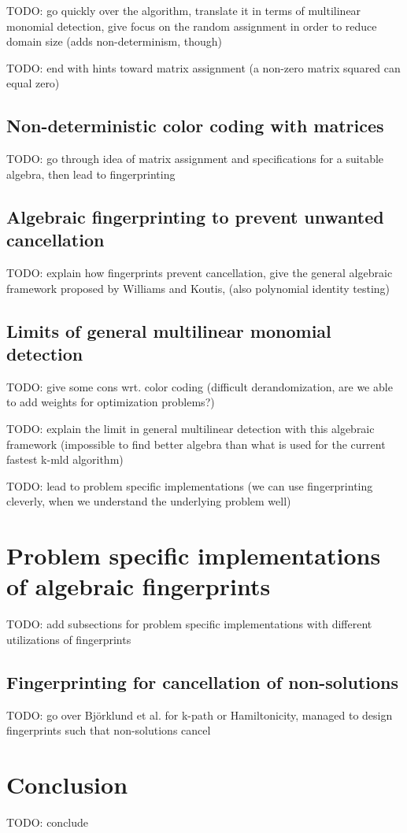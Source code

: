 TODO: go quickly over the algorithm, translate it in terms of multilinear monomial detection, 
give focus on the random assignment in order to reduce domain size (adds non-determinism, though)

TODO: end with hints toward matrix assignment (a non-zero matrix squared can equal zero)

\subsection{Non-deterministic color coding with matrices}

TODO: go through idea of matrix assignment and specifications for a suitable algebra, 
then lead to fingerprinting

\subsection{Algebraic fingerprinting to prevent unwanted cancellation}

TODO: explain how fingerprints prevent cancellation, 
give the general algebraic framework proposed by Williams and Koutis, 
(also polynomial identity testing)

\subsection{Limits of general multilinear monomial detection}

TODO: give some cons wrt. color coding (difficult derandomization, 
are we able to add weights for optimization problems?) %

TODO: explain the limit in general multilinear detection with this algebraic framework 
(impossible to find better algebra than what is used for the current fastest k-mld algorithm)

TODO: lead to problem specific implementations 
(we can use fingerprinting cleverly, when we understand the underlying problem well)

\section{Problem specific implementations of algebraic fingerprints}

TODO: add subsections for problem specific implementations with different utilizations of fingerprints

\subsection{Fingerprinting for cancellation of non-solutions}

TODO: go over Björklund et al. for k-path or Hamiltonicity, managed to design fingerprints such that non-solutions cancel

\section{Conclusion}

TODO: conclude